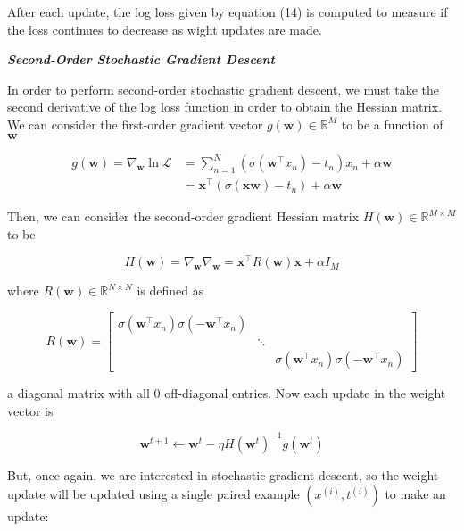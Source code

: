 \documentclass[12pt]{extarticle}
\begin{document}
After each update, the log loss given by equation (14) is computed to measure if the loss continues to decrease as wight updates are made.

\textbf{\textit{Second-Order Stochastic Gradient Descent}}

In order to perform second-order stochastic gradient descent, we must take the second derivative of the log loss function in order to obtain the Hessian matrix. We can consider the first-order gradient vector $g(\mathbf{w}) \in \mathbb{R}^M$ to be a function of $\mathbf{w}$

\begin{align}
g(\mathbf{w}) = \nabla_\mathbf{w} \ln \mathcal{L} &= \sum_{n=1}^N (\sigma(\textbf{w}^\top x_n) - t_n)x_n + \alpha \mathbf{w} \\
&= \mathbf{x}^\top (\sigma(\mathbf{x} \textbf{w}) - t_n) + \alpha \mathbf{w}
\end{align}

Then, we can consider the second-order gradient Hessian matrix $H(\mathbf{w}) \in \mathbb{R}^{M \times M}$ to be

\begin{equation}
H(\mathbf{w}) = \nabla_\mathbf{w} \nabla_\mathbf{w} = \mathbf{x}^\top R(\mathbf{w}) \mathbf{x} + \alpha I_M
\end{equation}

where $R(\mathbf{w}) \in \mathbb{R}^{N \times N}$ is defined as

\begin{equation}
R(\mathbf{w}) =
  \begin{bmatrix}
    \sigma(\textbf{w}^\top x_n)\sigma(-\textbf{w}^\top x_n) & & \\
    & \ddots & \\
    & & \sigma(\textbf{w}^\top x_n) \sigma(-\textbf{w}^\top x_n)
  \end{bmatrix}
\end{equation}

a diagonal matrix with all 0 off-diagonal entries. Now each update in the weight vector is

\begin{equation}
\mathbf{w}^{t+1} \leftarrow \mathbf{w}^{t} - \eta H(\mathbf{w}^{t})^{-1} g(\mathbf{w}^{t})
\end{equation}

But, once again, we are interested in stochastic gradient descent, so the weight update will be updated using a single paired example $(x^{(i)}, t^{(i)})$ to make an update:
\end{document}
